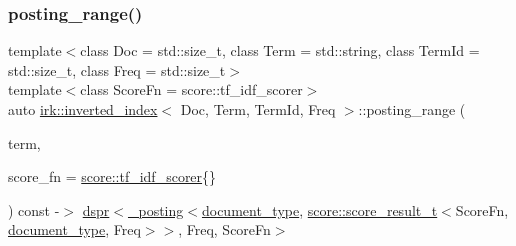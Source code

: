 \subsubsection{\texorpdfstring{posting\+\_\+range()}{posting\_range()}\hspace{0.1cm}{\footnotesize\ttfamily [1/2]}}
{\footnotesize\ttfamily template$<$class Doc  = std\+::size\+\_\+t, class Term  = std\+::string, class Term\+Id  = std\+::size\+\_\+t, class Freq  = std\+::size\+\_\+t$>$ \\
template$<$class Score\+Fn  = score\+::tf\+\_\+idf\+\_\+scorer$>$ \\
auto \mbox{\hyperlink{classirk_1_1inverted__index}{irk\+::inverted\+\_\+index}}$<$ Doc, Term, Term\+Id, Freq $>$\+::posting\+\_\+range (\begin{DoxyParamCaption}\item[{const std\+::string \&}]{term,  }\item[{Score\+Fn}]{score\+\_\+fn = {\ttfamily \mbox{\hyperlink{structirk_1_1score_1_1tf__idf__scorer}{score\+::tf\+\_\+idf\+\_\+scorer}}\{\}} }\end{DoxyParamCaption}) const -\/$>$ \mbox{\hyperlink{namespaceirk_af92c7aae439f59ccae252f027f851c24}{dspr}}$<$\mbox{\hyperlink{structirk_1_1__posting}{\+\_\+posting}}$<$\mbox{\hyperlink{classirk_1_1inverted__index_ab708a9d1605de705341f3ed81bd7d5e7}{document\+\_\+type}}, \mbox{\hyperlink{namespaceirk_1_1score_af4a2c84b3548a4ac12aac3862bc94875}{score\+::score\+\_\+result\+\_\+t}}$<$Score\+Fn, \mbox{\hyperlink{classirk_1_1inverted__index_ab708a9d1605de705341f3ed81bd7d5e7}{document\+\_\+type}}, Freq$>$$>$,
            Freq,
            Score\+Fn$>$
    \hspace{0.3cm}{\ttfamily [inline]}}

\mbox{\label{classirk_1_1inverted__index_adde74983c6f5bab062296561b3b0b010}} 
